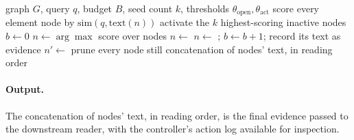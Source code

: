 \begin{algorithm}[t]
\caption{Budgeted best-first evidence control}
\label{alg:controller}
\begin{algorithmic}[1]
\Require graph $G$, query $q$, budget $B$, seed count $k$, thresholds $\theta_{\text{open}}, \theta_{\text{act}}$
\State score every element node by $\mathrm{sim}(q, \text{text}(n))$
\State activate the $k$ highest-scoring inactive nodes 
\State $b \gets 0$
  \State $n \gets \arg\max$ score over  nodes
    \State $n \gets$  
  \Else
    \State $n \gets$ ; $b \gets b + 1$; record its text as evidence
        \State $n' \gets$ 
      \EndIf
    \EndFor
  \EndIf
\EndWhile
\State prune every node still  
\State \Return concatenation of  nodes' text, in reading order
\end{algorithmic}
\end{algorithm}

\paragraph{Output.} The concatenation of  nodes' text, in reading order, is the final evidence passed to the downstream reader, with the controller's action log available for inspection.
